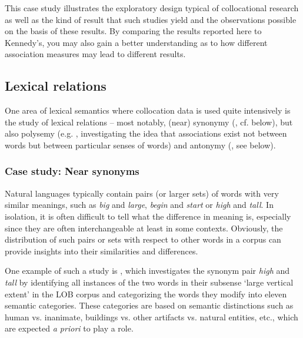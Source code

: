 This case study illustrates the exploratory  design  typical of collocational  research as well as the kind of result that such studies yield and the observations possible on the basis of these results. By comparing the results reported here to Kennedy's, you may also gain a better understanding as to how different association  measures  may lead to different results.

\subsection{Lexical relations}
\label{sec:lexicalrelations}

One area of lexical semantics  where collocation  data is used quite intensively is the study of lexical relations -- most notably, (near) synonymy  (\citealt{taylor_near_2003}, cf. below), but also polysemy (e.g. \citealt{yarowsky_one_1993}, investigating the idea that associations  exist not between words but between particular senses of words) and antonymy  (\citealt{justeson_co-occurrences_1991}, see below).

\subsubsection{Case study: Near synonyms}
\label{sec:nearsynonyms}

Natural languages typically contain pairs (or larger sets) of words with very similar meanings,  such as \textit{big} and \textit{large}, \textit{begin} and \textit{start} or \textit{high} and \textit{tall}. In isolation, it is often difficult to tell what the difference in meaning is, especially since they are often interchangeable at least in some contexts. Obviously, the distribution  of such pairs or sets with respect to other words in a corpus can provide insights into their similarities and differences.

One example of such a study is \citet{taylor_near_2003}, which investigates the synonym  pair \textit{high} and \textit{tall} by identifying all instances of the two words in their subsense `large vertical extent' in the LOB  corpus and categorizing  the words they modify into eleven semantic  categories. These categories are based on semantic distinctions such as human  vs. inanimate, buildings vs. other artifacts vs. natural entities, etc., which are expected \textit{a priori} to play a role.

